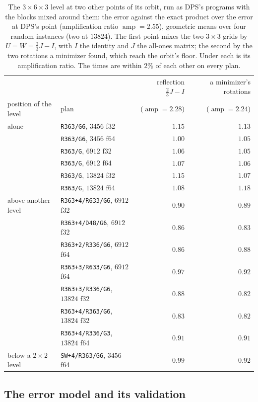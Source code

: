 \documentclass[11pt]{article}
\newcommand{\amp}{\operatorname{amp}}
\newcommand{\lv}[1]{\texttt{#1}}
\begin{document}
\begin{table}[!tbp]
\centering\footnotesize
\begin{tabular}{llrr}
\toprule
 & & reflection $\tfrac23J-I$ & a minimizer's rotations\\
position of the level & plan & ($\amp=2.28$) & ($\amp=2.24$)\\
\midrule
alone & \lv{R363/G6}, $3456$ f32 & $1.15$ & $1.13$\\
 & \lv{R363/G6}, $3456$ f64 & $1.00$ & $1.05$\\
 & \lv{R363/G}, $6912$ f32 & $1.06$ & $1.05$\\
 & \lv{R363/G}, $6912$ f64 & $1.07$ & $1.06$\\
 & \lv{R363/G}, $13824$ f32 & $1.15$ & $1.07$\\
 & \lv{R363/G}, $13824$ f64 & $1.08$ & $1.18$\\
\midrule
above another level & \lv{R363+4/R633/G6}, $6912$ f32 & $0.90$ & $0.89$\\
 & \lv{R363+4/D48/G6}, $6912$ f32 & $0.86$ & $0.83$\\
 & \lv{R363+2/R336/G6}, $6912$ f64 & $0.86$ & $0.88$\\
 & \lv{R363+3/R633/G6}, $6912$ f64 & $0.97$ & $0.92$\\
 & \lv{R363+3/R336/G6}, $13824$ f32 & $0.88$ & $0.82$\\
 & \lv{R363+4/R363/G6}, $13824$ f32 & $0.83$ & $0.82$\\
 & \lv{R363+4/R336/G3}, $13824$ f64 & $0.91$ & $0.91$\\
\midrule
below a $2\times2$ level & \lv{SW+4/R363/G6}, $3456$ f64 & $0.99$ & $0.92$\\
\bottomrule
\end{tabular}
\caption{The $3\times6\times3$ level at two other points of its orbit, run
as DPS's programs with the blocks mixed around them: the error against the
exact product over the error at DPS's point (amplification ratio
$\amp=2.55$), geometric means over four random instances (two at $13824$).
The first point mixes the two $3\times3$ grids by $U=W=\tfrac23J-I$, with $I$
the identity and $J$ the all-ones matrix; the second by the two rotations a
minimizer found, which reach the orbit's floor.  Under each is its
amplification ratio.  The times are within $2\%$ of each other on every
plan.}
\label{tab:r363pts}
\end{table}

\subsection{The error model and its validation}\label{sec:errmodel}
\end{document}

